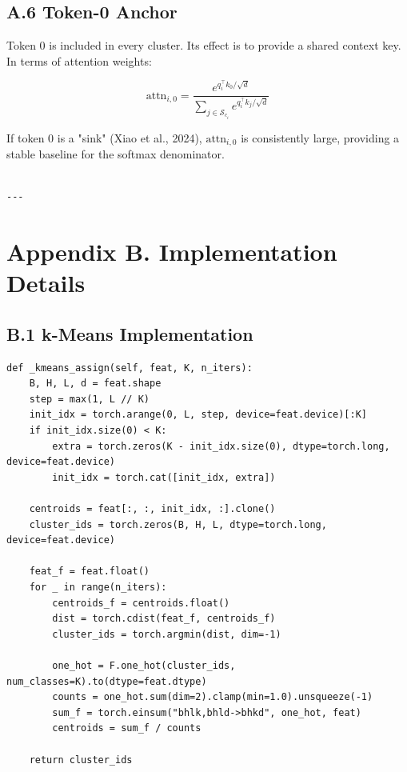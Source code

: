 \subsection{A.6 Token-0 Anchor}

Token 0 is included in every cluster. Its effect is to provide a shared 
context key. In terms of attention weights:

\[
\text{attn}_{i,0} = \frac{e^{q_i^\top k_0 / \sqrt{d}}}{\sum_{j \in \mathcal{S}_{c_i}} e^{q_i^\top k_j / \sqrt{d}}}
\tag{A.8}
\]

If token 0 is a "sink" (Xiao et al., 2024), $\text{attn}_{i,0}$ is 
consistently large, providing a stable baseline for the softmax denominator.
\begin{lstlisting}

---
\end{lstlisting}


\section{Appendix B. Implementation Details}

\subsection{B.1 k-Means Implementation}

\begin{lstlisting}
def _kmeans_assign(self, feat, K, n_iters):
    B, H, L, d = feat.shape
    step = max(1, L // K)
    init_idx = torch.arange(0, L, step, device=feat.device)[:K]
    if init_idx.size(0) < K:
        extra = torch.zeros(K - init_idx.size(0), dtype=torch.long, device=feat.device)
        init_idx = torch.cat([init_idx, extra])

    centroids = feat[:, :, init_idx, :].clone()
    cluster_ids = torch.zeros(B, H, L, dtype=torch.long, device=feat.device)

    feat_f = feat.float()
    for _ in range(n_iters):
        centroids_f = centroids.float()
        dist = torch.cdist(feat_f, centroids_f)
        cluster_ids = torch.argmin(dist, dim=-1)

        one_hot = F.one_hot(cluster_ids, num_classes=K).to(dtype=feat.dtype)
        counts = one_hot.sum(dim=2).clamp(min=1.0).unsqueeze(-1)
        sum_f = torch.einsum("bhlk,bhld->bhkd", one_hot, feat)
        centroids = sum_f / counts

    return cluster_ids
\end{lstlisting}

